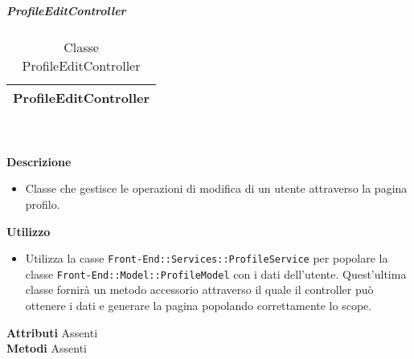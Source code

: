 			\subparagraph{ProfileEditController} 
\begin{table}[ht]
\begin{center}
\bgroup
	\setlength{\arrayrulewidth}{0.6mm}
	\def\arraystretch{1}
		\begin{tabular}{ | p{12cm} | }
				\hline  
					\centerline{\textbf{ProfileEditController}}
		\\ \hline 
				\hline
				\hline
		
		\end{tabular}
\egroup
\caption{Classe ProfileEditController}
\end{center}
\end{table} \textbf{\\ \\ Descrizione}
\begin{itemize}
\item[] Classe che gestisce le operazioni di modifica di un utente attraverso la pagina profilo.
\end{itemize} 
\textbf{Utilizzo}
\begin{itemize}
\item[] Utilizza la casse \texttt{Front-End::Services::ProfileService} per popolare la classe \texttt{Front-End::Model::ProfileModel} con i dati dell'utente. Quest'ultima classe fornirà un metodo accessorio attraverso il quale il controller può ottenere i dati e generare la pagina popolando correttamente lo scope.
\end{itemize}
\textbf{Attributi}
Assenti \\
\textbf{Metodi}
Assenti \\

